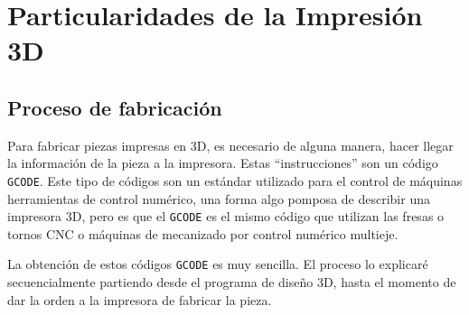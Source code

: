 \chapter{Particularidades de la Impresión 3D}\label{ch:3d-intro}

\section{Proceso de fabricación}
Para fabricar piezas impresas en 3D, es necesario de alguna manera, hacer llegar la información de la pieza a la impresora. Estas ``instrucciones'' son un código \texttt{GCODE}. Este tipo de códigos son un estándar utilizado para el control de máquinas herramientas de control numérico, una forma algo pomposa de describir una impresora 3D, pero es que el \texttt{GCODE} es el mismo código que utilizan las fresas o tornos CNC o máquinas de mecanizado por control numérico multieje. 
\par La obtención de estos códigos \texttt{GCODE} es muy sencilla. El proceso lo explicaré secuencialmente partiendo desde el programa de diseño 3D, hasta el momento de dar la orden a la impresora de fabricar la pieza. 

